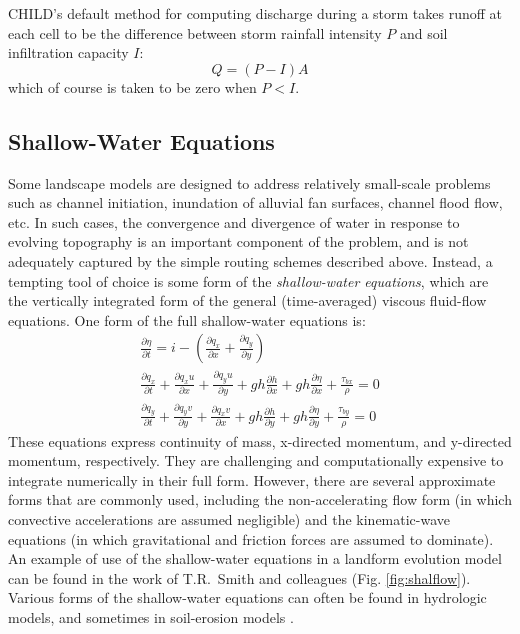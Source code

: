 \documentclass[12pt,reqno]{amsart}
\begin{document}
CHILD's default method for computing discharge during a storm takes runoff at each cell to be the difference between storm rainfall intensity $P$ and soil infiltration capacity $I$:
\begin{equation}
Q = (P-I) A
\end{equation}
which of course is taken to be zero when $P<I$.

\subsection{Shallow-Water Equations}

Some landscape models are designed to address relatively small-scale problems such as channel initiation, inundation of alluvial fan surfaces, channel flood flow, etc. In such cases, the convergence and divergence of water in response to evolving topography is an important component of the problem, and is not adequately captured by the simple routing schemes described above. Instead, a tempting tool of choice is some form of the {\em shallow-water equations}, which are the vertically integrated form of the general (time-averaged) viscous fluid-flow equations. One form of the full shallow-water equations is:
\begin{eqnarray}
\frac{\partial \eta}{\partial t} = i - \left( \frac{\partial q_x}{\partial x}
+ \frac{\partial q_y}{\partial y} \right ) \\
\frac{\partial q_x}{\partial t} + \frac{\partial q_x u}{\partial x}
+ \frac{\partial q_y u}{\partial y}
+ g h \frac{\partial h}{\partial x}
+ g h \frac{\partial \eta}{\partial x}
+ \frac{\tau_{bx}}{\rho} = 0 \\
\frac{\partial q_y}{\partial t} + \frac{\partial q_y v}{\partial y}
+ \frac{\partial q_x v}{\partial x}
+ g h \frac{\partial h}{\partial y}
+ g h \frac{\partial \eta}{\partial y}
+ \frac{\tau_{by}}{\rho} = 0
\end{eqnarray}
These equations express continuity of mass, x-directed momentum, and y-directed momentum, respectively. They are challenging and computationally expensive to integrate numerically in their full form. However, there are several approximate forms that are commonly used, including the non-accelerating flow form (in which convective accelerations are assumed negligible) and the kinematic-wave equations (in which gravitational and friction forces are assumed to dominate). An example of use of the shallow-water equations in a landform evolution model can be found in the work of T.R.\ Smith and colleagues (Fig. \ref{fig:shalflow}). Various forms of the shallow-water equations can often be found in hydrologic models, and sometimes in soil-erosion models \citep[e.g.,][]{mitas1998distributed}.
\end{document}
